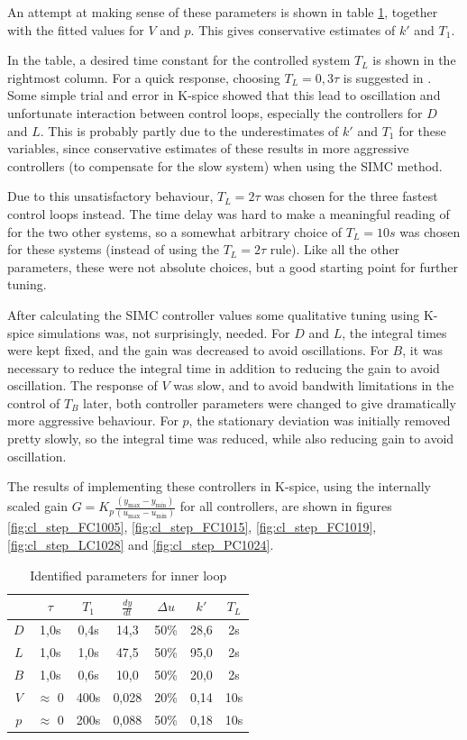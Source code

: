 \documentclass[12pt]{article}
\begin{document}
An attempt at making sense of these parameters is shown in table \ref{tab:inner_loop_step_responses}, together with the fitted values for $V$ and $p$. This gives conservative estimates of $k'$ and $T_1$.

In the table, a desired time constant for the controlled system $T_L$ is shown in the rightmost column. For a quick response, choosing $T_L = 0,3\tau$ is suggested in \cite{balchen}. Some simple trial and error in K-spice showed that this lead to oscillation and unfortunate interaction between control loops, especially the controllers for $D$ and $L$. This is probably partly due to the underestimates of $k'$ and $T_1$ for these variables, since conservative estimates of these results in more aggressive controllers (to compensate for the slow system) when using the SIMC method.

Due to this unsatisfactory behaviour, $T_L = 2\tau$ was chosen for the three fastest control loops instead. The time delay was hard to make a meaningful reading of for the two other systems, so a somewhat arbitrary choice of $T_L = 10s$ was chosen for these systems (instead of using the $T_L = 2\tau$ rule). Like all the other parameters, these were not absolute choices, but a good starting point for further tuning.

After calculating the SIMC controller values some qualitative tuning using K-spice simulations was, not surprisingly, needed. For $D$ and $L$, the integral times were kept fixed, and the gain was decreased to avoid oscillations. For $B$, it was necessary to reduce the integral time in addition to reducing the gain to avoid oscillation. The response of $V$ was slow, and to avoid bandwith limitations in the control of $T_B$ later, both controller parameters were changed to give dramatically more aggressive behaviour. For $p$, the stationary deviation was initially removed pretty slowly, so the integral time was reduced, while also reducing gain to avoid oscillation.

The results of implementing these controllers in K-spice, using the internally scaled gain $G = K_p \frac{(y_{\max} - y_{\min})}{(u_{\max} - u_{\min})}$ for all controllers, are shown in figures \ref{fig:cl_step_FC1005}, \ref{fig:cl_step_FC1015}, \ref{fig:cl_step_FC1019}, \ref{fig:cl_step_LC1028} and \ref{fig:cl_step_PC1024}.


\begin{table}
\centering
\begin{tabular}{c | c | c | c | c | c || c}
& $\tau$ & $T_1$ & $\frac{dy}{dt}$ & $\Delta u$ & $k'$ & $T_L$ \\ \hline
$D$ & 1,0s & 0,4s & 14,3 & 50\% & 28,6 & 2s \\
$L$ & 1,0s & 1,0s & 47,5 & 50\% & 95,0 & 2s \\
$B$ & 1,0s & 0,6s & 10,0 & 50\% & 20,0 & 2s \\
$V$ & $\approx$ 0 & 400s & 0,028 & 20\% & 0,14 & 10s \\
$p$ & $\approx$ 0 & 200s & 0,088 & 50\% & 0,18 & 10s
\end{tabular}
\caption{Identified parameters for inner loop}
\label{tab:inner_loop_step_responses}
\end{table}
\end{document}
